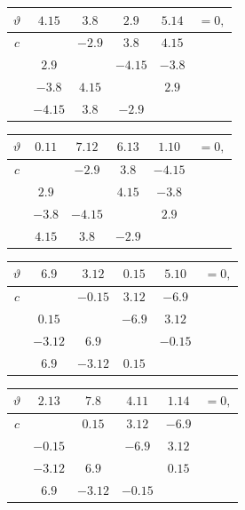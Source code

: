 \documentclass[11pt]{article}
\begin{document}
{\footnotesize
\begin{center}
\begin{tabular}{c|cccc|c}\hline
$\vartheta$ & $4.15$ & $3.8$ & $2.9$ & $5.14$ & $=0,$\\\hline
$c$ & & $-2.9$ & $3.8$ & $4.15$ & \\
& $2.9$ & & $-4.15$ & $-3.8$ & \\
& $-3.8$ & $4.15$ & & $2.9$ & \\
& $-4.15$ & $3.8$ & $-2.9$ & & \\\hline
\end{tabular}
\hspace{0.8em}
\begin{tabular}{c|cccc|c}\hline
$\vartheta$ & $0.11$ & $7.12$ & $6.13$ & $1.10$ & $=0,$\\\hline
$c$ & & $-2.9$ & $3.8$ & $-4.15$ & \\
& $2.9$ & & $4.15$ & $-3.8$ & \\
& $-3.8$ & $-4.15$ & & $2.9$ & \\
& $4.15$ & $3.8$ & $-2.9$ & & \\\hline
\end{tabular}
\end{center}

\smallskip
\begin{center}
\begin{tabular}{c|cccc|c}\hline
$\vartheta$ & $6.9$ & $3.12$ & $0.15$ & $5.10$ & $=0,$\\\hline
$c$ & & $-0.15$ & $3.12$ & $-6.9$ & \\
& $0.15$ & & $-6.9$ & $3.12$ & \\
& $-3.12$ & $6.9$ & & $-0.15$ & \\
& $6.9$ & $-3.12$ & $0.15$ & & \\\hline
\end{tabular}
\hspace{0.8em}
\begin{tabular}{c|cccc|c}\hline
$\vartheta$ & $2.13$ & $7.8$ & $4.11$ & $1.14$ & $=0,$\\\hline
$c$ & & $0.15$ & $3.12$ & $-6.9$ & \\
& $-0.15$ & & $-6.9$ & $3.12$ & \\
& $-3.12$ & $6.9$ & & $0.15$ & \\
& $6.9$ & $-3.12$ & $-0.15$ & & \\\hline
\end{tabular}
\end{center}

}
\end{document}
